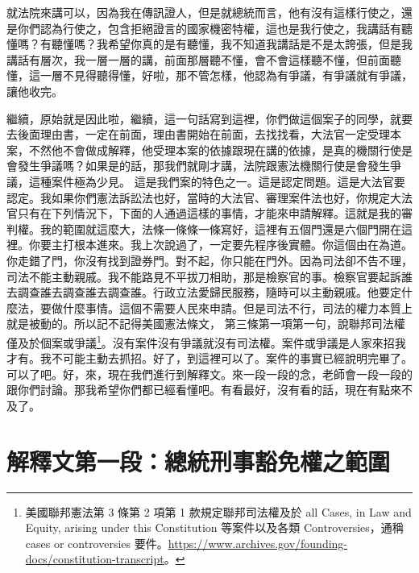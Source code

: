 \hypertarget{c11:cue:37}{}就法院來講可以，因為我在傳訊證人，但是就總統而言，他有沒有這樣行使之，還是你們認為行使之，包含拒絕證言的國家機密特權，這也是我行使之，我講話有聽懂嗎？有聽懂嗎？我希望你真的是有聽懂，我不知道我講話是不是太誇張，但是我講話有層次，我一層一層的講，前面那層聽不懂，會不會這樣聽不懂，但前面聽懂，這一層不見得聽得懂，好啦，那不管怎樣，他認為有爭議，有爭議就有爭議，讓他收完。

\hypertarget{c11:cue:38}{}繼續，原始就是因此啦，繼續，這一句話寫到這裡，你們做這個案子的同學，就要去後面理由書，一定在前面，理由書開始在前面，去找找看，大法官一定受理本案，不然他不會做成解釋，他受理本案的依據跟現在講的依據，是真的機關行使是會發生爭議嗎？如果是的話，那我們就剛才講，法院跟憲法機關行使是會發生爭議，這種案件極為少見。
\hypertarget{c11:cue:39}{}這是我們案的特色之一。這是認定問題。這是大法官要認定。我如果你們憲法訴訟法也好，當時的大法官、審理案件法也好，你規定大法官只有在下列情況下，下面的人通過這樣的事情，才能來申請解釋。這就是我的審判權。我的範圍就這麼大，法條一條條一條寫好，這裡有五個門還是六個門開在這裡。你要主打根本進來。我上次說過了，一定要先程序後實體。你這個由在為道。
\hypertarget{c11:cue:40}{}你走錯了門，你沒有找到證券門。對不起，你只能在門外。因為司法卻不告不理，司法不能主動親戚。我不能路見不平拔刀相助，那是檢察官的事。檢察官要起訴誰去調查誰去調查誰去調查誰。行政立法愛歸民服務，隨時可以主動親戚。他要定什麼法，要做什麼事情。這個不需要人民來申請。但是司法不行，司法的權力本質上就是被動的。所以記不記得美國憲法條文，
\hypertarget{c11:cue:41}{}第三條第一項第一句，說聯邦司法權僅及於個案或爭議\footnote{美國聯邦憲法第 3 條第 2 項第 1 款規定聯邦司法權及於 all Cases, in Law and Equity, arising under this Constitution 等案件以及各類 Controversies，通稱 cases or controversies 要件。\url{https://www.archives.gov/founding-docs/constitution-transcript}。}。沒有案件沒有爭議就沒有司法權。案件或爭議是人家來招我才有。我不可能主動去抓招。好了，到這裡可以了。案件的事實已經說明完畢了。可以了吧。好，來，現在我們進行到解釋文。來一段一段的念，老師會一段一段的跟你們討論。那我希望你們都已經看懂吧。有看最好，沒有看的話，現在有點來不及了。

\section{解釋文第一段：總統刑事豁免權之範圍}

